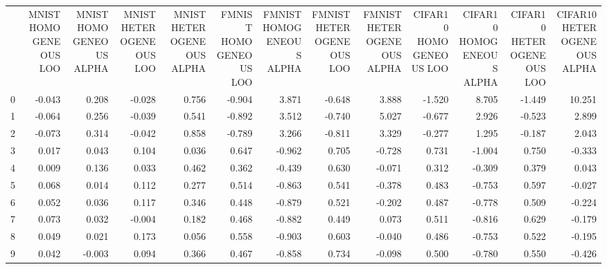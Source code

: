 \begin{tabular}{lrrrrrrrrrrrr}
 & MNIST HOMOGENEOUS LOO & MNIST HOMOGENEOUS ALPHA & MNIST HETEROGENEOUS LOO & MNIST HETEROGENEOUS ALPHA & FMNIST HOMOGENEOUS LOO & FMNIST HOMOGENEOUS ALPHA & FMNIST HETEROGENEOUS LOO & FMNIST HETEROGENEOUS ALPHA & CIFAR10 HOMOGENEOUS LOO & CIFAR10 HOMOGENEOUS ALPHA & CIFAR10 HETEROGENEOUS LOO & CIFAR10 HETEROGENEOUS ALPHA \\
0 & -0.043 & 0.208 & -0.028 & 0.756 & -0.904 & 3.871 & -0.648 & 3.888 & -1.520 & 8.705 & -1.449 & 10.251 \\
1 & -0.064 & 0.256 & -0.039 & 0.541 & -0.892 & 3.512 & -0.740 & 5.027 & -0.677 & 2.926 & -0.523 & 2.899 \\
2 & -0.073 & 0.314 & -0.042 & 0.858 & -0.789 & 3.266 & -0.811 & 3.329 & -0.277 & 1.295 & -0.187 & 2.043 \\
3 & 0.017 & 0.043 & 0.104 & 0.036 & 0.647 & -0.962 & 0.705 & -0.728 & 0.731 & -1.004 & 0.750 & -0.333 \\
4 & 0.009 & 0.136 & 0.033 & 0.462 & 0.362 & -0.439 & 0.630 & -0.071 & 0.312 & -0.309 & 0.379 & 0.043 \\
5 & 0.068 & 0.014 & 0.112 & 0.277 & 0.514 & -0.863 & 0.541 & -0.378 & 0.483 & -0.753 & 0.597 & -0.027 \\
6 & 0.052 & 0.036 & 0.117 & 0.346 & 0.448 & -0.879 & 0.521 & -0.202 & 0.487 & -0.778 & 0.509 & -0.224 \\
7 & 0.073 & 0.032 & -0.004 & 0.182 & 0.468 & -0.882 & 0.449 & 0.073 & 0.511 & -0.816 & 0.629 & -0.179 \\
8 & 0.049 & 0.021 & 0.173 & 0.056 & 0.558 & -0.903 & 0.603 & -0.040 & 0.486 & -0.753 & 0.522 & -0.195 \\
9 & 0.042 & -0.003 & 0.094 & 0.366 & 0.467 & -0.858 & 0.734 & -0.098 & 0.500 & -0.780 & 0.550 & -0.426 \\
\end{tabular}

